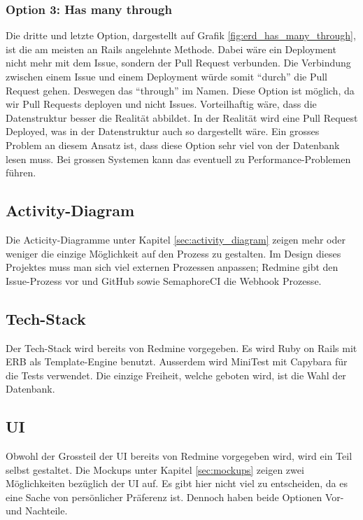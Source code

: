 \subsubsection{Option 3: Has many through}
\label{sec:decide_has_many_through}
Die dritte und letzte Option, dargestellt auf Grafik \ref{fig:erd_has_many_through}, ist die am meisten an Rails angelehnte
Methode. Dabei wäre ein Deployment nicht mehr mit dem Issue, sondern der Pull Request verbunden. Die Verbindung zwischen
einem Issue und einem Deployment würde somit \enquote{durch} die Pull Request gehen. Deswegen das \enquote{through} im Namen.
Diese Option ist möglich, da wir Pull Requests deployen und nicht Issues. \newline
Vorteilhaftig wäre, dass die Datenstruktur besser die Realität abbildet. In der Realität wird eine Pull Request Deployed,
was in der Datenstruktur auch so dargestellt wäre. \newline
Ein grosses Problem an diesem Ansatz ist, dass diese Option sehr viel von der Datenbank lesen muss. Bei grossen Systemen
kann das eventuell zu Performance-Problemen führen.

\subsection{Activity-Diagram}
Die Acticity-Diagramme unter Kapitel \ref{sec:activity_diagram} zeigen mehr oder weniger die einzige Möglichkeit auf den
Prozess zu gestalten. Im Design dieses Projektes muss man sich viel externen Prozessen anpassen; Redmine gibt den
Issue-Prozess vor und GitHub sowie SemaphoreCI die Webhook Prozesse.

\subsection{Tech-Stack}
Der Tech-Stack wird bereits von Redmine vorgegeben. Es wird Ruby on Rails mit ERB als Template-Engine benutzt. Ausserdem
wird MiniTest mit Capybara für die Tests verwendet. \newline
Die einzige Freiheit, welche geboten wird, ist die Wahl der Datenbank.

\subsection{UI}
Obwohl der Grossteil der UI bereits von Redmine vorgegeben wird, wird ein Teil selbst gestaltet. Die Mockups unter Kapitel
\ref{sec:mockups} zeigen zwei Möglichkeiten bezüglich der UI auf. \newline
Es gibt hier nicht viel zu entscheiden, da es eine Sache von persönlicher Präferenz ist. Dennoch haben beide Optionen
Vor- und Nachteile. \newline

